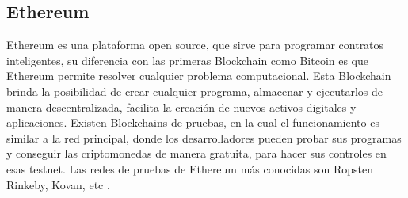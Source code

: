\subsection{Ethereum}
Ethereum es una plataforma open source, que sirve para programar contratos inteligentes, 
  su diferencia con las primeras  Blockchain como Bitcoin  es que Ethereum 
 permite resolver cualquier problema computacional. Esta  Blockchain brinda
 la posibilidad  de crear cualquier programa,  almacenar   y ejecutarlos de manera descentralizada,  facilita la creación de nuevos activos digitales y aplicaciones.
Existen Blockchains de pruebas, en la cual el funcionamiento  es 
similar a la red principal, donde los desarrolladores pueden probar sus programas
y conseguir las criptomonedas de manera gratuita, para hacer sus controles en
esas testnet. Las redes de pruebas de Ethereum más conocidas son Ropsten
Rinkeby, Kovan, etc \cite[]{dannen_introducing_2017,vazquez_episodio_2020,torres_Blockchain_nodate,sadouskaya_adoption_2017}.

